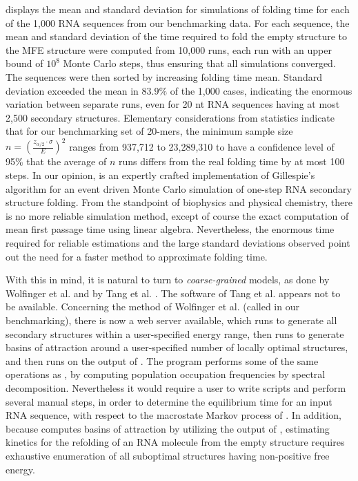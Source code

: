  displays the mean
and standard deviation for \kinfold simulations of folding time
for each of the 1,000 RNA sequences from our benchmarking data. For
each sequence, the mean and standard deviation of the time required to
fold the empty structure to the MFE structure were computed from
10,000 \kinfold runs, each run with an upper bound of $10^8$
Monte Carlo steps, thus ensuring that all simulations converged. The
sequences were then sorted by increasing folding time mean. Standard
deviation exceeded the mean in $83.9\%$ of the 1,000 cases, indicating
the enormous variation between separate \kinfold runs, even for
20 nt RNA sequences having at most 2,500 secondary structures.
Elementary considerations from statistics indicate that for our benchmarking set
of 20-mers, the minimum sample size $n = \left( \frac{z_{\alpha/2}
\cdot \sigma}{E} \right)^2$ ranges from 937,712 to 23,289,310
to have a confidence level of 95\% that the average of $n$
\kinfold runs differs from the real folding time by at most 100 steps.
In our opinion, \kinfold is an expertly crafted implementation of
Gillespie's algorithm for an event driven Monte Carlo simulation of
one-step RNA secondary structure folding. From the standpoint of
biophysics and physical chemistry, there is no more reliable
simulation method, except of course the exact computation of mean
first passage time using linear algebra. Nevertheless, the enormous
time required for reliable \kinfold estimations and the large
standard deviations observed point out the need for a faster method to
approximate folding time.

With this in mind, it is natural to turn to {\em coarse-grained} models,
as done by Wolfinger et al. \citep{wolfingerstadler:kinetics} and by
Tang et al. \citep{tang.jmb08}. The software of Tang et al. appears not
to be available. Concerning the method of Wolfinger et al. (called
 in our benchmarking), there is now a web server available,
which runs \rnasub \citep{wuchty.b99} to generate all secondary structures within
a user-specified energy range, then runs \barriers \citep{flammhofacker}
to generate basins of attraction around a user-specified number of locally
optimal structures, and then runs \treekin on the output of \barriers.
The program \treekin performs some of the same operations as \hermes,
by computing population occupation frequencies by spectral decomposition.
Nevertheless it would require a user to write scripts and perform
several manual steps, in order to determine the equilibrium time for
an input RNA sequence, with respect to the macrostate Markov process
of \citep{wolfingerstadler:kinetics}. In addition, because \barriers computes
basins of attraction by utilizing the output of \rnasub, estimating kinetics
for the refolding of an RNA molecule from the empty structure requires
exhaustive enumeration of all suboptimal structures having non-positive
free energy.

